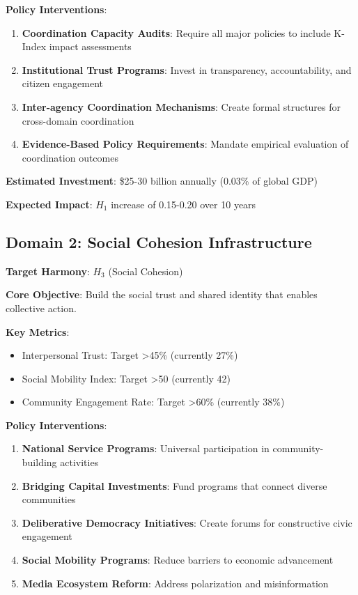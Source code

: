 \documentclass[12pt,letterpaper]{article}
\begin{document}
\textbf{Policy Interventions}:

\begin{enumerate}
    \item \textbf{Coordination Capacity Audits}: Require all major policies to include K-Index impact assessments
    \item \textbf{Institutional Trust Programs}: Invest in transparency, accountability, and citizen engagement
    \item \textbf{Inter-agency Coordination Mechanisms}: Create formal structures for cross-domain coordination
    \item \textbf{Evidence-Based Policy Requirements}: Mandate empirical evaluation of coordination outcomes
\end{enumerate}

\textbf{Estimated Investment}: \$25-30 billion annually (0.03\% of global GDP)

\textbf{Expected Impact}: $H_1$ increase of 0.15-0.20 over 10 years

\subsection{Domain 2: Social Cohesion Infrastructure}

\textbf{Target Harmony}: $H_3$ (Social Cohesion)

\textbf{Core Objective}: Build the social trust and shared identity that enables collective action.

\textbf{Key Metrics}:
\begin{itemize}
    \item Interpersonal Trust: Target >45\% (currently 27\%)
    \item Social Mobility Index: Target >50 (currently 42)
    \item Community Engagement Rate: Target >60\% (currently 38\%)
\end{itemize}

\textbf{Policy Interventions}:

\begin{enumerate}
    \item \textbf{National Service Programs}: Universal participation in community-building activities
    \item \textbf{Bridging Capital Investments}: Fund programs that connect diverse communities
    \item \textbf{Deliberative Democracy Initiatives}: Create forums for constructive civic engagement
    \item \textbf{Social Mobility Programs}: Reduce barriers to economic advancement
    \item \textbf{Media Ecosystem Reform}: Address polarization and misinformation
\end{enumerate}
\end{document}
